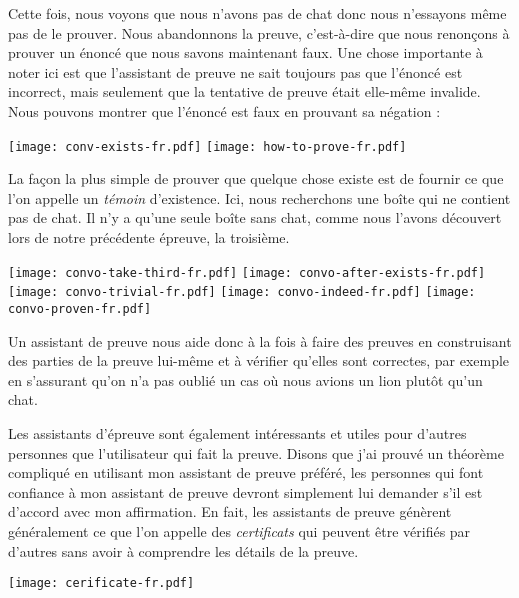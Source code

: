 Cette fois, nous voyons que nous n'avons pas de chat donc nous n'essayons même
pas de le prouver.
Nous abandonnons la preuve, c'est-à-dire que nous renonçons à prouver un
énoncé que nous savons maintenant faux.
Une chose importante à noter ici est que l'assistant de preuve ne sait toujours
pas que l'énoncé est incorrect, mais seulement que la tentative de preuve était
elle-même invalide.
Nous pouvons montrer que l'énoncé est faux en prouvant sa négation :

\begin{center}
  \texttt{[image: conv-exists-fr.pdf]}
  \texttt{[image: how-to-prove-fr.pdf]}
\end{center}

La façon la plus simple de prouver que quelque chose existe est de fournir ce
que l'on appelle un \emph{témoin} d'existence. Ici, nous recherchons une boîte
qui ne contient pas de chat. Il n'y a qu'une seule boîte sans chat, comme nous
l'avons découvert lors de notre précédente épreuve, la troisième.

\begin{center}
  \texttt{[image: convo-take-third-fr.pdf]}
  \texttt{[image: convo-after-exists-fr.pdf]}
  \texttt{[image: convo-trivial-fr.pdf]}
  \texttt{[image: convo-indeed-fr.pdf]}
  \texttt{[image: convo-proven-fr.pdf]}
\end{center}

Un assistant de preuve nous aide donc à la fois à faire des preuves en
construisant des parties de la preuve lui-même et à vérifier qu'elles sont
correctes, par exemple en s'assurant qu'on n'a pas oublié un cas où nous avions
un lion plutôt qu'un chat.

Les assistants d'épreuve sont également intéressants et utiles pour d'autres
personnes que l'utilisateur qui fait la preuve. Disons que j'ai prouvé un
théorème compliqué en utilisant mon assistant de preuve préféré, les personnes
qui font confiance à mon assistant de preuve devront simplement lui demander
s'il est d'accord avec mon affirmation.
En fait, les assistants de preuve génèrent généralement ce que l'on appelle des
\emph{certificats} qui peuvent être vérifiés par d'autres sans avoir à
comprendre les détails de la preuve.

\begin{center}
  \texttt{[image: cerificate-fr.pdf]}
\end{center}

